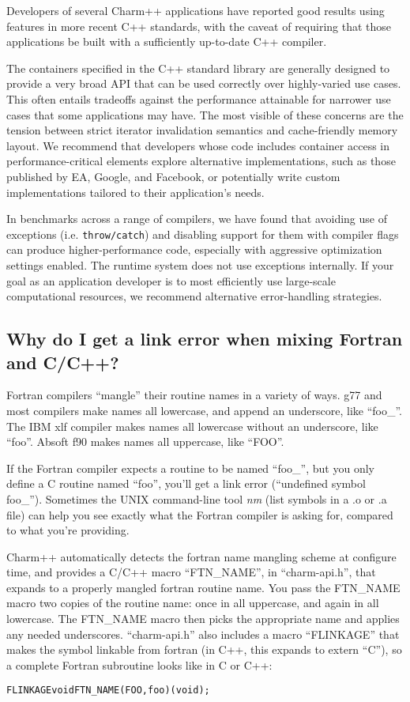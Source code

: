 Developers of several Charm++ applications have reported good results
using features in more recent C++ standards, with the caveat of
requiring that those applications be built with a sufficiently
up-to-date C++ compiler.

The containers specified in the C++ standard library are generally
designed to provide a very broad API that can be used correctly over
highly-varied use cases. This often entails tradeoffs against the
performance attainable for narrower use cases that some applications
may have. The most visible of these concerns are the tension between
strict iterator invalidation semantics and cache-friendly memory
layout. We recommend that developers whose code includes container
access in performance-critical elements explore alternative
implementations, such as those published by EA, Google, and Facebook,
or potentially write custom implementations tailored to their
application's needs.

In benchmarks across a range of compilers, we have found that avoiding
use of exceptions (i.e. \verb+throw/catch+) and disabling support for
them with compiler flags can produce higher-performance code,
especially with aggressive optimization settings enabled. The runtime
system does not use exceptions internally. If your goal as an
application developer is to most efficiently use large-scale
computational resources, we recommend alternative error-handling
strategies.

\subsection{Why do I get a link error when mixing Fortran and C/C++?}

\label{f2c}

Fortran compilers ``mangle'' their routine names in a variety
of ways.  g77 and most compilers make names all lowercase, and 
append an underscore, like ``foo\_''.  The IBM xlf compiler makes 
names all lowercase without an underscore, like ``foo''. Absoft f90 
makes names all uppercase, like ``FOO''. 

If the Fortran compiler expects a routine to be named ``foo\_'',
but you only define a C routine named ``foo'', you'll get a link 
error (``undefined symbol foo\_'').  Sometimes the UNIX command-line
tool {\em nm} (list symbols in a .o or .a file) can help you see exactly what the 
Fortran compiler is asking for, compared to what you're providing.

Charm++ automatically detects the fortran name mangling scheme
at configure time, and provides a C/C++ macro ``FTN\_NAME'', in ``charm-api.h'',
that expands to a properly mangled fortran routine name.
You pass the FTN\_NAME macro
two copies of the routine name: once in all uppercase, and again 
in all lowercase.
The FTN\_NAME macro then picks the appropriate name and applies any
needed underscores.  ``charm-api.h'' also includes a macro ``FLINKAGE''
that makes the symbol linkable from fortran (in C++, this expands
to extern ``C''), so a complete Fortran subroutine looks like in C or C++:
\begin{alltt}
FLINKAGE void FTN\_NAME(FOO,foo)(void);
\end{alltt}


